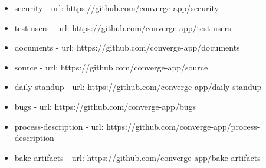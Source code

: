 \begin{itemize}
  \item security - url: https://github.com/converge-app/security
  \item test-users - url: https://github.com/converge-app/test-users
  \item documents - url: https://github.com/converge-app/documents
  \item source - url: https://github.com/converge-app/source
  \item daily-standup - url: https://github.com/converge-app/daily-standup
  \item bugs - url: https://github.com/converge-app/bugs
  \item process-description - url: https://github.com/converge-app/process-description
  \item bake-artifacts - url: https://github.com/converge-app/bake-artifacts
\end{itemize}
